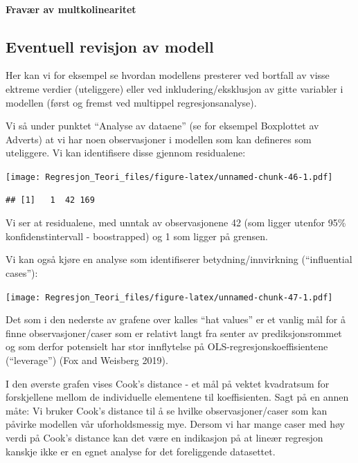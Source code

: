 \documentclass[
]{article}
\begin{document}
\hypertarget{fravuxe6r-av-multkolinearitet}{%
\paragraph{Fravær av
multkolinearitet}\label{fravuxe6r-av-multkolinearitet}}

\hypertarget{eventuell-revisjon-av-modell}{%
\subsection{Eventuell revisjon av
modell}\label{eventuell-revisjon-av-modell}}

Her kan vi for eksempel se hvordan modellens presterer ved bortfall av
visse ektreme verdier (uteliggere) eller ved inkludering/eksklusjon av
gitte variabler i modellen (først og fremst ved multippel
regresjonsanalyse).

Vi så under punktet ``Analyse av dataene'' (se for eksempel Boxplottet
av Adverts) at vi har noen observasjoner i modellen som kan defineres
som uteliggere. Vi kan identifisere disse gjennom residualene:

\texttt{[image: Regresjon\_Teori\_files/figure-latex/unnamed-chunk-46-1.pdf]}

\begin{verbatim}
## [1]   1  42 169
\end{verbatim}

Vi ser at residualene, med unntak av observasjonene 42 (som ligger
utenfor 95\% konfidenstintervall - boostrapped) og 1 som ligger på
grensen.

Vi kan også kjøre en analyse som identifiserer betydning/innvirkning
(``influential cases''):

\texttt{[image: Regresjon\_Teori\_files/figure-latex/unnamed-chunk-47-1.pdf]}

Det som i den nederste av grafene over kalles ``hat values'' er et
vanlig mål for å finne observasjoner/caser som er relativt langt fra
senter av prediksjonsrommet og som derfor potensielt har stor
innflytelse på OLS-regresjonskoeffisientene (``leverage'') (Fox and
Weisberg 2019).

I den øverste grafen vises Cook's distance - et mål på vektet kvadratsum
for forskjellene mellom de individuelle elementene til koeffisienten.
Sagt på en annen måte: Vi bruker Cook's distance til å se hvilke
observasjoner/caser som kan påvirke modellen vår uforholdsmessig mye.
Dersom vi har mange caser med høy verdi på Cook's distance kan det være
en indikasjon på at lineær regresjon kanskje ikke er en egnet analyse
for det foreliggende datasettet.
\end{document}
